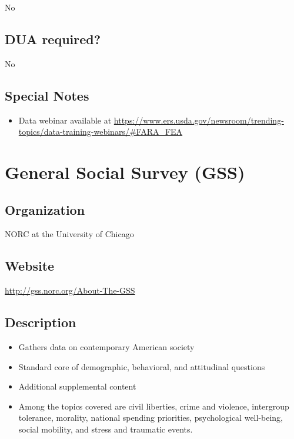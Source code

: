 \documentclass[
]{book}
\providecommand{\tightlist}{%
  \setlength{\itemsep}{0pt}\setlength{\parskip}{0pt}}
\begin{document}
No

\hypertarget{dua-required-27}{%
\section{DUA required?}\label{dua-required-27}}

No

\hypertarget{special-notes-27}{%
\section{Special Notes}\label{special-notes-27}}

\begin{itemize}
\tightlist
\item
  Data webinar available at \url{https://www.ers.usda.gov/newsroom/trending-topics/data-training-webinars/\#FARA_FEA}
\end{itemize}

\mainmatter

\hypertarget{general-social-survey-gss}{%
\chapter{General Social Survey (GSS)}\label{general-social-survey-gss}}

\hypertarget{organization-28}{%
\section{Organization}\label{organization-28}}

NORC at the University of Chicago

\hypertarget{website-28}{%
\section{Website}\label{website-28}}

\url{http://gss.norc.org/About-The-GSS}

\hypertarget{description-28}{%
\section{Description}\label{description-28}}

\begin{itemize}
\tightlist
\item
  Gathers data on contemporary American society
\item
  Standard core of demographic, behavioral, and attitudinal questions
\item
  Additional supplemental content
\item
  Among the topics covered are civil liberties, crime and violence, intergroup tolerance, morality, national spending priorities, psychological well-being, social mobility, and stress and traumatic events.
\end{itemize}
\end{document}
